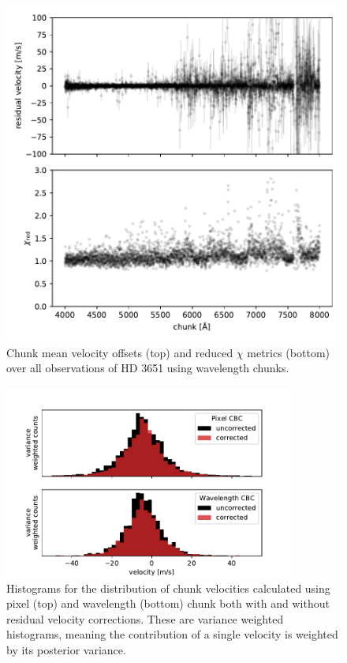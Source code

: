 \begin{figure}
    \centering
    \includegraphics[width=\textwidth]{figures-5/wvln-chunk-resid.pdf}
    \caption[Forward model chunk velocity offsets and reduced $\chi$ metrics -- wavelength chunks]{Chunk mean velocity offsets (top) and reduced $\chi$ metrics (bottom) over all observations of HD 3651 using wavelength chunks.}
    \label{fig:wvln-chunk-resid}
\end{figure}

\begin{figure}
    \centering
    \includegraphics[width=0.85\textwidth]{figures-5/cbc-hist.pdf}
    \caption[Chunk velocity distribution with and without correction]{Histograms for the distribution of chunk velocities calculated using pixel (top) and wavelength (bottom) chunk both with and without residual velocity corrections. These are variance weighted histograms, meaning the contribution of a single velocity is weighted by its posterior variance.}
    \label{fig:cbc-hist}
\end{figure}


